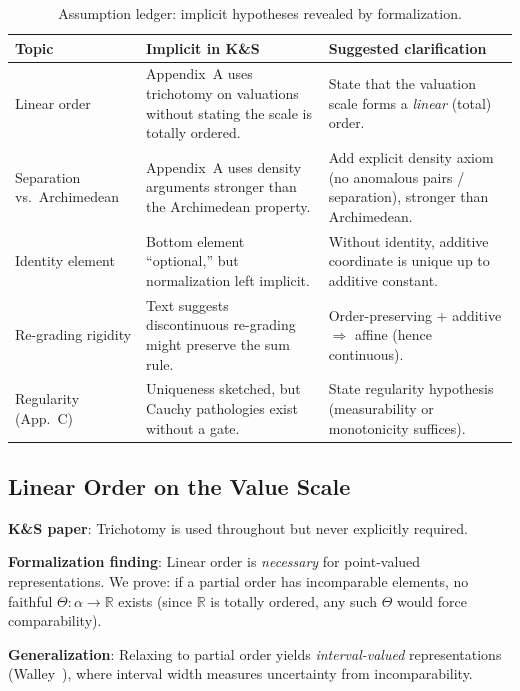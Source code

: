 \documentclass[11pt]{article}
\begin{document}
\begin{table}[ht]
\centering
\small
\renewcommand{\arraystretch}{1.4}
\begin{tabular}{@{} p{2.8cm} p{5.5cm} p{5.5cm} @{}}
\toprule
\textbf{Topic} & \textbf{Implicit in K\&S} & \textbf{Suggested clarification} \\
\midrule
Linear order &
Appendix~A uses trichotomy on valuations without stating the scale is totally ordered. &
State that the valuation scale forms a \emph{linear} (total) order. \\[4pt]

Separation vs.\ Archimedean &
Appendix~A uses density arguments stronger than the Archimedean property. &
Add explicit density axiom (no anomalous pairs / separation), stronger than Archimedean. \\[4pt]

Identity element &
Bottom element ``optional,'' but normalization left implicit. &
Without identity, additive coordinate is unique up to additive constant. \\[4pt]

Re-grading rigidity &
Text suggests discontinuous re-grading might preserve the sum rule. &
Order-preserving + additive $\Rightarrow$ affine (hence continuous). \\[4pt]

Regularity (App.~C) &
Uniqueness sketched, but Cauchy pathologies exist without a gate. &
State regularity hypothesis (measurability or monotonicity suffices). \\
\bottomrule
\end{tabular}
\caption{Assumption ledger: implicit hypotheses revealed by formalization.}
\label{tab:assumption-ledger}
\end{table}

\subsection{Linear Order on the Value Scale}

\textbf{K\&S paper}: Trichotomy is used throughout but never explicitly required.

\textbf{Formalization finding}: Linear order is \emph{necessary} for point-valued representations.
We prove: if a partial order has incomparable elements, no faithful $\Theta : \alpha \to \mathbb{R}$
exists (since $\mathbb{R}$ is totally ordered, any such $\Theta$ would force comparability).

\textbf{Generalization}: Relaxing to partial order yields \emph{interval-valued} representations
(Walley~\cite{Walley1991}), where interval width measures uncertainty from incomparability.
\end{document}
